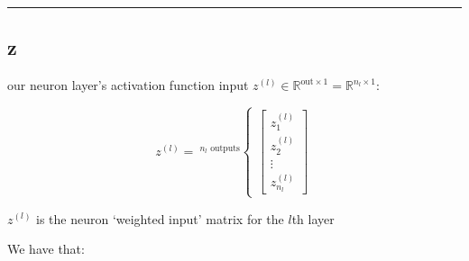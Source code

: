 \documentclass[
]{book}
\begin{document}
\begin{center}\rule{0.5\linewidth}{0.5pt}\end{center}

\hypertarget{z}{%
\subsection{z}\label{z}}

our neuron layer's activation function input \(z^{(l)} \in \mathbb{R}^{\text{out} \times 1} = \mathbb{R}^{n_l \times 1}\):

\[
z^{(l)} = \ ^{n_l\text{ outputs}}
  \begin{cases}
    \begin{bmatrix}
      z^{(l)}_{1} \\
      z^{(l)}_{2} \\
      \vdots \\
      z^{(l)}_{n_l}
    \end{bmatrix}
  \end{cases}
\]

\(z^{(l)}\) is the neuron `weighted input' matrix for the \(l\)th layer

We have that:
\end{document}
